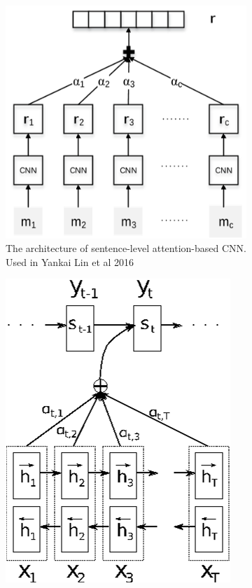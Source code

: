 \documentclass{article}
\begin{document}
	\begin{figure}[h!]
		\centering
		\begin{subfigure}[b]{0.2\linewidth}
			\includegraphics[width=\linewidth]{figure1.png}
			\caption{The architecture of sentence-level attention-based CNN. Used in Yankai Lin et al 2016}
		\end{subfigure}
		\begin{subfigure}[b]{0.2\linewidth}
			\includegraphics[width=\linewidth]{attention-method-1.png}

\end{subfigure}
\end{figure}
\end{document}
